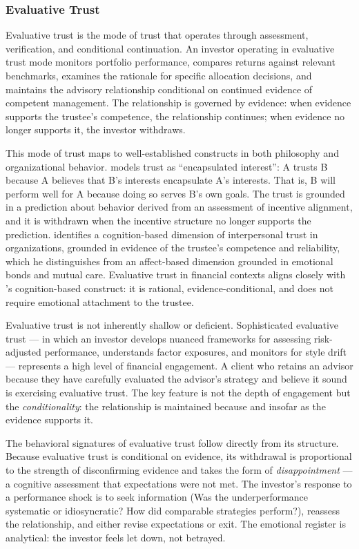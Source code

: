 \subsubsection{Evaluative Trust}
\label{subsubsec:evaluative_trust}

Evaluative trust is the mode of trust that operates through assessment, verification, and conditional continuation. An investor operating in evaluative trust mode monitors portfolio performance, compares returns against relevant benchmarks, examines the rationale for specific allocation decisions, and maintains the advisory relationship conditional on continued evidence of competent management. The relationship is governed by evidence: when evidence supports the trustee's competence, the relationship continues; when evidence no longer supports it, the investor withdraws.

This mode of trust maps to well-established constructs in both philosophy and organizational behavior. \citet{Hardin2002} models trust as ``encapsulated interest'': A trusts B because A believes that B's interests encapsulate A's interests. That is, B will perform well for A because doing so serves B's own goals. The trust is grounded in a prediction about behavior derived from an assessment of incentive alignment, and it is withdrawn when the incentive structure no longer supports the prediction. \citet{McAllister1995} identifies a cognition-based dimension of interpersonal trust in organizations, grounded in evidence of the trustee's competence and reliability, which he distinguishes from an affect-based dimension grounded in emotional bonds and mutual care. Evaluative trust in financial contexts aligns closely with \citeauthor{McAllister1995}'s cognition-based construct: it is rational, evidence-conditional, and does not require emotional attachment to the trustee.

Evaluative trust is not inherently shallow or deficient. Sophisticated evaluative trust --- in which an investor develops nuanced frameworks for assessing risk-adjusted performance, understands factor exposures, and monitors for style drift --- represents a high level of financial engagement. A client who retains an advisor because they have carefully evaluated the advisor's strategy and believe it sound is exercising evaluative trust. The key feature is not the depth of engagement but the \textit{conditionality}: the relationship is maintained because and insofar as the evidence supports it.

The behavioral signatures of evaluative trust follow directly from its structure. Because evaluative trust is conditional on evidence, its withdrawal is proportional to the strength of disconfirming evidence and takes the form of \textit{disappointment} --- a cognitive assessment that expectations were not met. The investor's response to a performance shock is to seek information (Was the underperformance systematic or idiosyncratic? How did comparable strategies perform?), reassess the relationship, and either revise expectations or exit. The emotional register is analytical: the investor feels let down, not betrayed.

